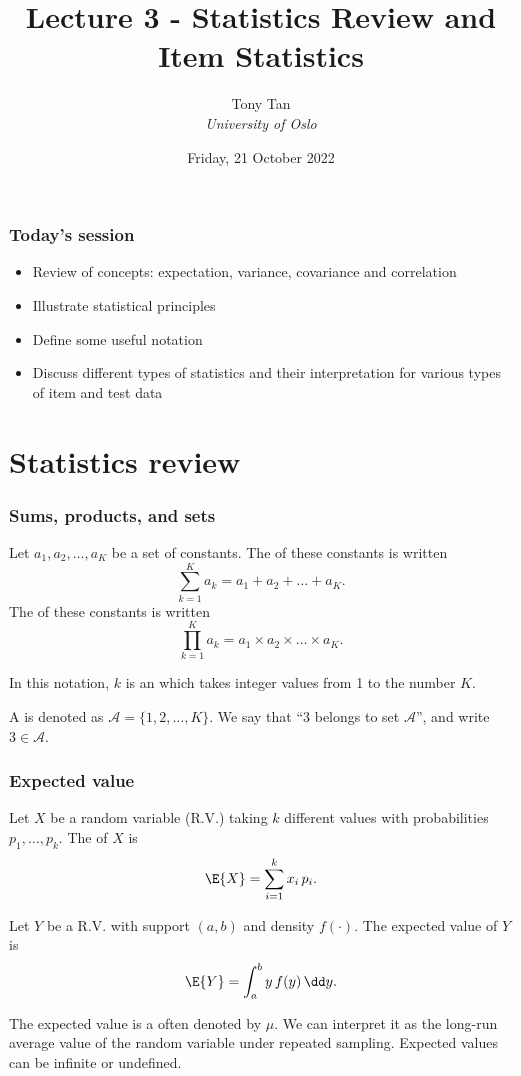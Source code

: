 \documentclass[compress]{beamer}\usepackage[]{graphicx}\usepackage[]{xcolor}
\title{Lecture 3 - Statistics Review and Item Statistics}
\author[]{Tony Tan \\\vspace{6pt} {\em{University of Oslo}} }
\date{Friday, 21 October 2022}
\begin{document}
\begin{frame}[fragile]
  \titlepage
\end{frame}


\begin{frame}[fragile]
  \frametitle{Today's session}
    \begin{itemize}
      \item Review of concepts: expectation, variance, covariance and correlation
      \item Illustrate statistical principles
      \item Define some useful notation
      \item Discuss different types of statistics and their interpretation for various types of item and test data
    \end{itemize}
\end{frame}


\section{Statistics review}

\begin{frame}[fragile]
  \frametitle{Sums, products, and sets}
    Let $a_1, a_2, \dots, a_K$ be a set of constants. The  of these constants is written
      \[ \sum_{k = 1}^K a_k = a_1 + a_2 + \dots + a_K. \]
    The  of these constants is written
      \[ \prod_{k = 1}^K a_k = a_1 \times a_2 \times \dots \times a_K. \]

      In this notation, $k$ is an  which takes integer values from 1 to the number $K$.

    A  is denoted as $\mathcal{A} = \{1, 2, \dots, K\}$. We say that ``3 belongs to set $\mathcal{A}$'', and write $3 \in \mathcal{A}$.
\end{frame}


\begin{frame}[fragile]
  \frametitle{Expected value}
    Let $X$ be a  random variable (R.V.) taking $k$ different values with probabilities $p_1, \dots, p_k$. The  of $X$ is
      \[ \E{X} = \sum_{i = 1}^k x_i\, p_i. \]

      Let $Y$ be a  R.V. with support $(a, b)$ and density $f(\cdot)$. The expected value of $Y$ is
      \[ \E{Y}=\int_a^b y\, f(y)\, \dd y. \]

      The expected value is a  often denoted by $\mu$. We can interpret it as the long-run average value of the random variable under repeated sampling. Expected values can be infinite or undefined.
\end{frame}
\end{document}
